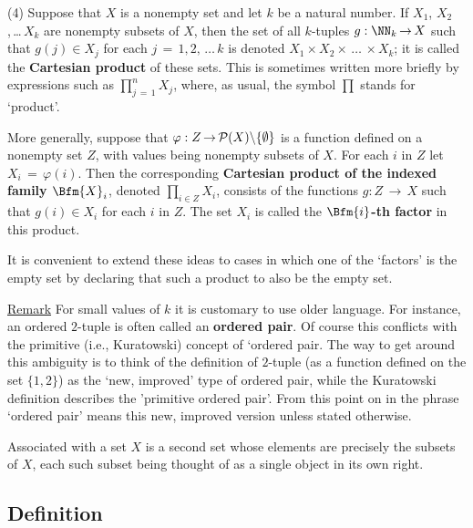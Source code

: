 \VV


        (4) Suppose that $X$ is a nonempty set and let $k$ be a natural number. If $X_{1}$, $X_{2}$,\,{\ldots}\,$X_{k}$ are nonempty subsets of $X$,
    then the set of all $k$-tuples $g:{\NN}_{k} \,{\rightarrow}\, X$ such that $g(j){\in}X_{j}$ for each $j \,=\, 1,2,\,{\ldots}\,k$ is denoted $X_{1}{\times}X_{2}{\times}\,{\ldots}\,{\times}X_{k}$; it is called the {\bf Cartesian product} of these sets.
    This is sometimes written more briefly by expressions such as ${\prod}_{j \,=\, 1}^{n} X_{j}$, where, as usual, the symbol $\prod$ stands for `product'.

        More generally, suppose that ${\varphi}:Z \,{\rightarrow}\, {\cal P}(X){\setminus}\{{\emptyset}\}$ is a function defined on a nonempty set $Z$, 
    with values being nonempty subsets of $X$.
    For each $i$ in $Z$ let $X_{i} \,=\, {\varphi}(i)$.
    Then the corresponding {\bf Cartesian product of the indexed family $\Bfm{X}_{i}$}, denoted ${\prod}_{i{\in}Z} X_{i}$,
    consists of the functions $g:Z \,{\rightarrow}\, X$ such that $g(i){\in}X_{i}$ for each $i$ in $Z$.
    The set $X_{i}$ is called the {\bf $\Bfm{i}$-th factor} in this product.

        It is convenient to extend these ideas to cases in which one of the `factors' is the empty set by declaring that such a product to also be the empty set.

        \underline{Remark} For small values of $k$ it is customary to use older language.
    For instance, an ordered $2$-tuple is often called an {\bf ordered pair}. Of course this conflicts with the primitive (i.e., Kuratowski) concept of `ordered pair.
    The way to get around this ambiguity is to think of the definition of $2$-tuple (as a function defined on the set $\{1,2\}$) as the `new, improved' type of ordered pair, while the Kuratowski definition describes the 'primitive ordered pair'.
    From this point on in {\TheseNotes} the phrase `ordered pair' means this new, improved version unless stated otherwise.

\V
\V

        Associated with a set $X$ is a second set whose elements are precisely the subsets of $X$,
    each such subset being thought of as a single object in its own right.

\V

        \subsection{\small{\bf Definition}}

